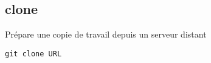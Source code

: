 \subsection*{clone}
Prépare une copie de travail depuis un serveur distant
\begin{verbatim}
git clone URL
\end{verbatim}

